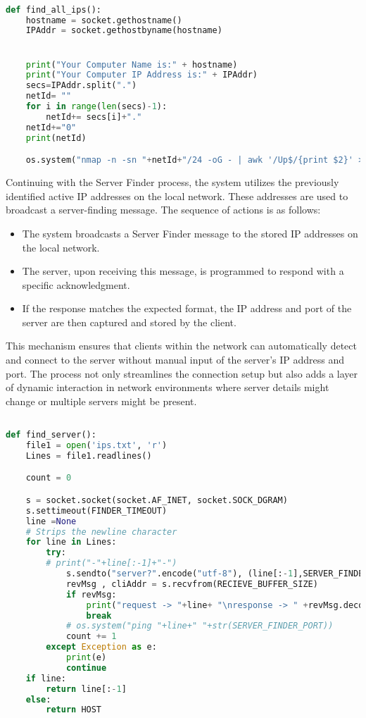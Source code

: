\begin{lstlisting}[language=Python]

def find_all_ips():
    hostname = socket.gethostname()
    IPAddr = socket.gethostbyname(hostname)


    print("Your Computer Name is:" + hostname)
    print("Your Computer IP Address is:" + IPAddr)
    secs=IPAddr.split(".")
    netId= ""
    for i in range(len(secs)-1):
        netId+= secs[i]+"."
    netId+="0"
    print(netId)

    os.system("nmap -n -sn "+netId+"/24 -oG - | awk '/Up$/{print $2}' > ips.txt")
\end{lstlisting}

Continuing with the Server Finder process, the system utilizes the previously identified active IP addresses on the local network. These addresses are used to broadcast a server-finding message. The sequence of actions is as follows:

\begin{itemize}
    \item The system broadcasts a Server Finder message to the stored IP addresses on the local network.
    \item The server, upon receiving this message, is programmed to respond with a specific acknowledgment.
    \item If the response matches the expected format, the IP address and port of the server are then captured and stored by the client.
\end{itemize}

This mechanism ensures that clients within the network can automatically detect and connect to the server without manual input of the server's IP address and port. The process not only streamlines the connection setup but also adds a layer of dynamic interaction in network environments where server details might change or multiple servers might be present.

\begin{lstlisting}[language=Python] 

def find_server():
    file1 = open('ips.txt', 'r')
    Lines = file1.readlines()

    count = 0

    s = socket.socket(socket.AF_INET, socket.SOCK_DGRAM)
    s.settimeout(FINDER_TIMEOUT)
    line =None
    # Strips the newline character
    for line in Lines:
        try:
        # print("-"+line[:-1]+"-")
            s.sendto("server?".encode("utf-8"), (line[:-1],SERVER_FINDER_PORT))
            revMsg , cliAddr = s.recvfrom(RECIEVE_BUFFER_SIZE)
            if revMsg:
                print("request -> "+line+ "\nresponse -> " +revMsg.decode())
                break
            # os.system("ping "+line+" "+str(SERVER_FINDER_PORT))
            count += 1
        except Exception as e:
            print(e)
            continue
    if line:
        return line[:-1]
    else:
        return HOST
\end{lstlisting}



